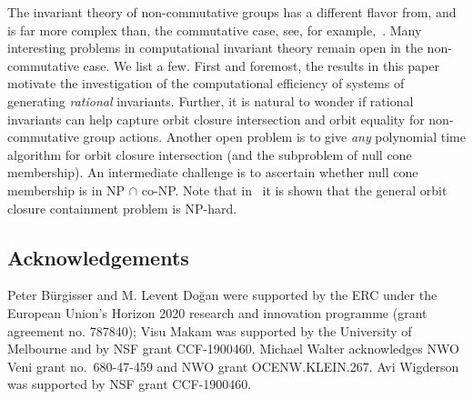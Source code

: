 The invariant theory of non-commutative groups has a different flavor from, and is far more complex than, the commutative case, see, for example,~\cite{Humphreys:75}.
Many interesting problems in computational invariant theory remain open in the non-commutative case.
We list a few.
First and foremost, the results in this paper motivate the investigation of the computational efficiency of systems of generating \emph{rational} invariants.
Further, it is natural to wonder if rational invariants can help capture orbit closure intersection and orbit equality for non-commutative group actions.
Another open problem is to give \emph{any} polynomial time algorithm for orbit closure intersection (and the subproblem of null cone membership).
An intermediate challenge is to ascertain whether null cone membership is in NP $\cap$ co-NP.
Note that in~\cite{BILPS:20} it is shown that the general orbit closure containment problem is NP-hard.


%
\subsection*{Acknowledgements}
%
Peter B\"urgisser and M. Levent Do\u{g}an were supported by the ERC under the European Union's Horizon 2020 research and innovation programme (grant agreement no. 787840);
Visu Makam was supported by the University of Melbourne and by NSF grant CCF-1900460.
Michael Walter acknowledges NWO Veni grant no.~680-47-459 and NWO grant OCENW.KLEIN.267.
Avi Wigderson was supported by NSF grant CCF-1900460.





